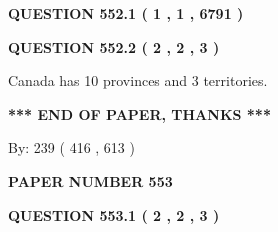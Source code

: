 \documentclass[12pt]{article}
\begin{document}
   
 \vspace{0.2in}
 
 
 
 
   
   
  
\vspace{0.2in}
  
{\textbf{\Large{QUESTION
552.1 
 ( 1 , 1 , 6791 )
}}}
  
  
  
\vspace{0.2in}
  
{\textbf{\Large{QUESTION
552.2 
 ( 2 , 2 , 3 )
}}}
  
  
 
 
\noindent{}
 
 
Canada has 10  provinces and 3 territories.
 
 
 
 
   
   
 \vspace{0.2in}
 
   
   
   
   
\vspace{1.0in} 
{\textbf{\large{ *** END OF PAPER, THANKS *** }}} 
   
   
\hspace{1.0in} By: 
 239 ( 416 ,  613 )
   
   
   
   
\newpage 
\setcounter{page}{ 
   553001 } 
   
   
   
   
 {\textbf{ \Large{ PAPER NUMBER  553  }}}
   
   
\vspace{0.2in}
   
   
   
   
   
   
 \vspace{0.2in}
 
 
 
 
   
   
  
\vspace{0.2in}
  
{\textbf{\Large{QUESTION
553.1 
 ( 2 , 2 , 3 )
}}}
  
  
 
\end{document}
